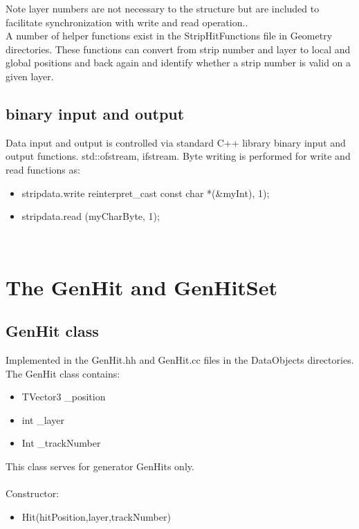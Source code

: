\documentclass[aps,prd,superscriptaddress,floatfix]{revtex4}
\begin{document}
Note layer numbers are not necessary to the
structure but are included to facilitate synchronization with write and read operation..
\\

A number of helper functions exist in the StripHitFunctions file in Geometry directories.  These functions
can convert from strip number and layer to local and global positions and back again and identify whether a strip number is valid
on a given layer.

\subsection{binary input and output}
Data input and output is controlled via standard C++ library binary input and
output functions. std::ofstream, ifstream.  Byte writing is performed for write and read functions as:

\begin{itemize}
\item stripdata.write reinterpret\_cast const char *(\&myInt), 1);
\item stripdata.read (myCharByte, 1);
\end{itemize}
\

\section{The GenHit and GenHitSet}
\subsection{GenHit class}
Implemented in the GenHit.hh and GenHit.cc files in the DataObjects directories.
\\

The GenHit class contains:\\

\begin{itemize}
\item TVector3 \_position
\item int \_layer
\item Int \_trackNumber
\end{itemize}


This class serves for generator GenHits only.\\
\\  

Constructor:

\begin{itemize}
\item Hit(hitPosition,layer,trackNumber)
\end{itemize}
\end{document}

